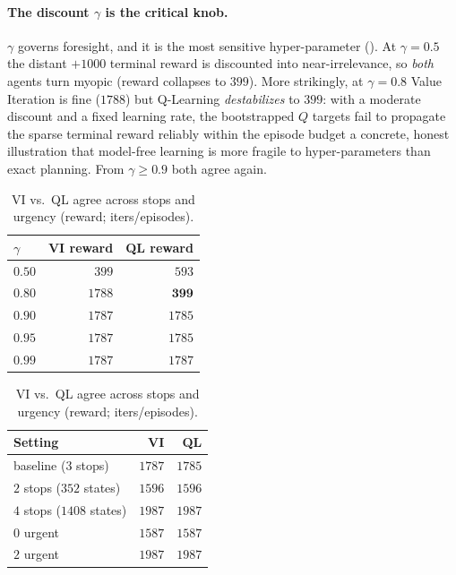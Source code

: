 \documentclass{ai-lab-report}
\begin{document}
\paragraph{The discount $\gamma$ is the critical knob.}
$\gamma$ governs foresight, and it is the most sensitive hyper-parameter (). At $\gamma=0.5$ the distant $+1000$ terminal reward is discounted into near-irrelevance, so \emph{both} agents turn myopic (reward collapses to $399$). More strikingly, at $\gamma=0.8$ Value Iteration is fine ($1788$) but Q-Learning \emph{destabilizes} to $399$: with a moderate discount and a fixed learning rate, the bootstrapped $Q$ targets fail to propagate the sparse terminal reward reliably within the episode budget a concrete, honest illustration that model-free learning is more fragile to hyper-parameters than exact planning. From $\gamma\ge0.9$ both agree again.

\begin{table}[H]
\centering
\begin{minipage}[t]{0.46\linewidth}
\centering
\small
\begin{tabularx}{\linewidth}{@{}Xrr@{}}
\toprule
$\gamma$ & VI reward & QL reward \\
\midrule
$0.50$ & $399$  & $593$ \\
$0.80$ & $1788$ & $\mathbf{399}$ \\
$0.90$ & $1787$ & $1785$ \\
$0.95$ & $1787$ & $1785$ \\
$0.99$ & $1787$ & $1787$ \\
\bottomrule
\end{tabularx}
\caption{Discount $\gamma$ sweep. QL destabilizes at $\gamma{=}0.8$.}
\label{tab:a4gamma}
\end{minipage}\hfill
\begin{minipage}[t]{0.5\linewidth}
\centering
\small
\begin{tabularx}{\linewidth}{@{}Xrr@{}}
\toprule
Setting & VI & QL \\
\midrule
baseline ($3$ stops) & $1787$ & $1785$ \\
$2$ stops ($352$ states) & $1596$ & $1596$ \\
$4$ stops ($1408$ states) & $1987$ & $1987$ \\
$0$ urgent & $1587$ & $1587$ \\
$2$ urgent & $1987$ & $1987$ \\
\bottomrule
\end{tabularx}
\caption{VI vs.\ QL agree across stops and urgency (reward; iters/episodes).}
\label{tab:a4}
\end{minipage}
\end{table}
\end{document}
